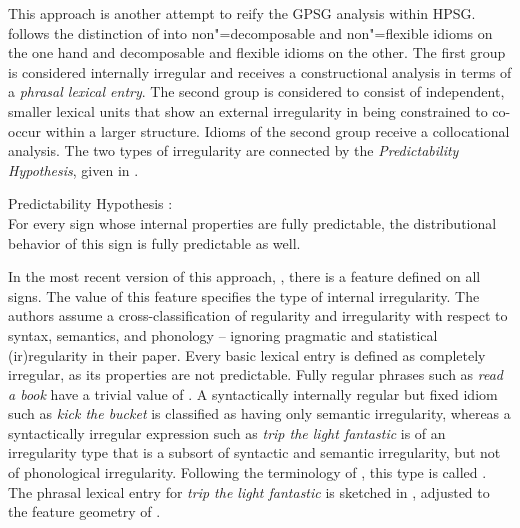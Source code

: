 \documentclass[output=paper
 	        ,biblatex
                ,babelshorthands
                ,newtxmath
                ,draftmode
                ,colorlinks, citecolor=brown
]{langscibook}
\begin{document}
This approach is another attempt to reify the GPSG analysis
within HPSG.  \citet{Sailer2000a} follows the distinction of \citet{NSW94a} into non"=decomposable
and non"=flexible idioms on the one hand and decomposable and flexible idioms on the other. The
first group is considered internally irregular and receives a constructional analysis in terms of a
\emph{phrasal lexical entry}. The second group is considered to consist of
independent, smaller lexical units that show an external irregularity in being constrained to
co-occur within a larger structure.  Idioms of the second group receive a collocational
analysis. The two types of irregularity are connected by the \emph{Predictability Hypothesis}, given
in .

\vbox{
\eanoraggedright 
\label{PredHypo}
Predictability Hypothesis \citep[]{Sailer2000a}:\\
For every sign whose internal properties are fully predictable, the distributional
behavior of this sign is fully predictable as well.
\z 
}

\noindent
In the most recent version of this approach, \citet{Richter:Sailer:09,Richter:Sailer:14}, there is a
feature  defined on all signs. The value of this feature specifies the type of internal
irregularity.  The authors assume a cross-classification of regularity and irregularity with respect
to syntax, semantics, and phonology -- ignoring pragmatic and statistical (ir)regularity in their
paper.  Every basic lexical entry is defined as completely irregular, as its properties are not
predictable.  Fully regular phrases such as \emph{read a book} have a trivial value of .
A syntactically internally regular but fixed idiom such as \emph{kick the bucket} is classified as
having only semantic irregularity, whereas a syntactically irregular expression such as \emph{trip
  the light fantastic} is of an irregularity type that is a subsort of syntactic and semantic
irregularity, but not of phonological irregularity.  Following the terminology of \citet{FKoC88a},
this type is called .
%
The phrasal lexical entry for \emph{trip the light fantastic} is sketched in ,
adjusted to the feature geometry of \citet{Sag97a}.
\end{document}
